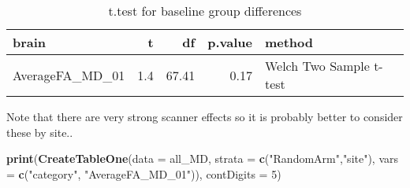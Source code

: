 \documentclass[]{article}
\newenvironment{Shaded}{\begin{snugshade}}{\end{snugshade}}
\newcommand{\KeywordTok}[1]{\textcolor[rgb]{0.13,0.29,0.53}{\textbf{#1}}}
\newcommand{\DataTypeTok}[1]{\textcolor[rgb]{0.13,0.29,0.53}{#1}}
\newcommand{\DecValTok}[1]{\textcolor[rgb]{0.00,0.00,0.81}{#1}}
\newcommand{\StringTok}[1]{\textcolor[rgb]{0.31,0.60,0.02}{#1}}
\newcommand{\OperatorTok}[1]{\textcolor[rgb]{0.81,0.36,0.00}{\textbf{#1}}}
\newcommand{\NormalTok}[1]{#1}
\theoremstyle{definition}
\theoremstyle{definition}
\theoremstyle{definition}
\theoremstyle{remark}
\begin{document}
\begin{Shaded}
\end{Shaded}

\begin{table}[t]

\caption{\label{tab:unnamed-chunk-9}t.test for baseline group differences}
\centering
\begin{tabular}{l|r|r|r|l}
\hline
brain & t & df & p.value & method\\
\hline
AverageFA\_MD\_01 & 1.4 & 67.41 & 0.17 & Welch Two Sample t-test\\
\hline
\end{tabular}
\end{table}

Note that there are very strong scanner effects so it is probably better
to consider these by site..

\begin{Shaded}
\begin{Highlighting}[]
\KeywordTok{print}\NormalTok{(}\KeywordTok{CreateTableOne}\NormalTok{(}\DataTypeTok{data =}\NormalTok{ all_MD,}
               \DataTypeTok{strata =} \KeywordTok{c}\NormalTok{(}\StringTok{"RandomArm"}\NormalTok{,}\StringTok{"site"}\NormalTok{),}
               \DataTypeTok{vars =} \KeywordTok{c}\NormalTok{(}\StringTok{"category"}\NormalTok{, }\StringTok{"AverageFA_MD_01"}\NormalTok{)), }\DataTypeTok{contDigits =} \DecValTok{5}\NormalTok{)}
\end{Highlighting}
\end{Shaded}
\end{document}
